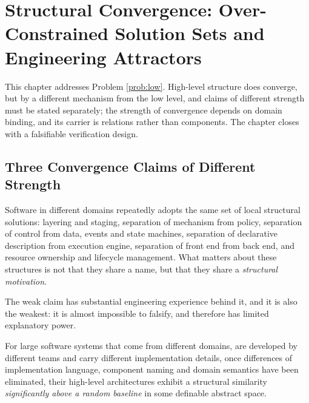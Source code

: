 \chapter[Structural Convergence]{Structural Convergence: Over-Constrained Solution Sets and Engineering Attractors}\label{ch:convergence}

This chapter addresses Problem \ref{prob:low}. High-level structure does converge, but by a
different mechanism from the low level, and claims of different strength must be stated
separately; the strength of convergence depends on domain binding, and its carrier is
relations rather than components. The chapter closes with a falsifiable verification design.

\section{Three Convergence Claims of Different Strength}\label{sec:three-claims}

\begin{hypothesis}\label{hyp:weak}
Software in different domains repeatedly adopts the same set of local structural solutions:
layering and staging, separation of mechanism from policy, separation of control from data,
events and state machines, separation of declarative description from execution engine,
separation of front end from back end, and resource ownership and lifecycle management.
What matters about these structures is not that they share a name, but that they share a
\emph{structural motivation}.
\end{hypothesis}

The weak claim has substantial engineering experience behind it, and it is also the weakest:
it is almost impossible to falsify, and therefore has limited explanatory power.

\begin{hypothesis}\label{hyp:medium}
For large software systems that come from different domains, are developed by different
teams and carry different implementation details, once differences of implementation
language, component naming and domain semantics have been eliminated, their high-level
architectures exhibit a structural similarity \emph{significantly above a random baseline}
in some definable abstract space.
\end{hypothesis}

